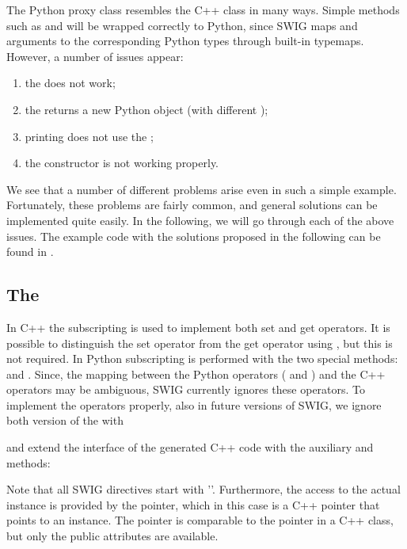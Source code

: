 The Python proxy class resembles the C++ class in many ways. Simple methods
such as  and  will be wrapped correctly to
Python, since SWIG maps  and  arguments to the
corresponding Python types through built-in typemaps.  
However, a number of issues appear:
\begin{enumerate}
\item the  does not work;
\item the  returns a new Python object (with different );
\item printing does not use the ;%
\item the  constructor is not working properly.%
\end{enumerate}
We see that a number of different problems arise even in such a simple
example. Fortunately, these problems are fairly common, and general
solutions can be implemented quite easily. In the following, we will go through 
each of the above issues. The example code with the solutions proposed in
the following can be found in . 

\subsection{The }
In C++ the subscripting  is used to implement both set and get
operators. It is possible to distinguish the set operator from the get
operator using , but this is not required.  
In Python subscripting is performed with the two special methods:  and . 
Since, the mapping between the Python operators 
( and ) and the C++ operators  
may be ambiguous, SWIG currently ignores these operators. 
To implement the operators properly, also in future versions of SWIG, we ignore both version of the  with
\begin{swigcode}
\end{swigcode}
and extend the interface of the generated C++ code with the auxiliary 
 and  methods: 
Note that all SWIG directives start with '\emp{\%}'.
Furthermore, the access to the actual instance is provided by the
 pointer, which in this case is a C++ pointer that points to an
 instance. The pointer is comparable to the  pointer
in a C++ class, but only the public attributes are available. 

